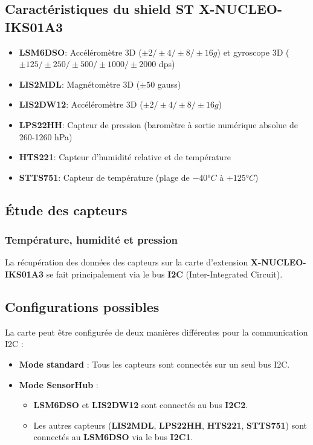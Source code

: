 \documentclass[12pt]{article}
\begin{document}
\subsection{Caractéristiques du shield ST X-NUCLEO-IKS01A3}
\begin{itemize}
    \item \textbf{LSM6DSO}: Accéléromètre 3D ($\pm2/\pm4/\pm8/\pm16g$) et gyroscope 3D ($\pm125/\pm250/\pm500/\pm1000/\pm2000$ dps)
    \item \textbf{LIS2MDL}: Magnétomètre 3D ($\pm50$ gauss)
    \item \textbf{LIS2DW12}: Accéléromètre 3D ($\pm2/\pm4/\pm8/\pm16g$)
    \item \textbf{LPS22HH}: Capteur de pression (baromètre à sortie numérique absolue de 260-1260 hPa)
    \item \textbf{HTS221}: Capteur d'humidité relative et de température
    \item \textbf{STTS751}: Capteur de température (plage de $-40°C$ à $+125°C$)
\end{itemize}

\subsection{Étude des capteurs}
\subsubsection{Température, humidité et pression}
La récupération des données des capteurs sur la carte d'extension \textbf{X-NUCLEO-IKS01A3} se fait principalement via le bus \textbf{I2C} (Inter-Integrated Circuit).

\subsection*{Configurations possibles}

La carte peut être configurée de deux manières différentes pour la communication I2C :
\begin{itemize}
    \item \textbf{Mode standard} : Tous les capteurs sont connectés sur un seul bus I2C.
    \item \textbf{Mode SensorHub} :
    \begin{itemize}
        \item \textbf{LSM6DSO} et \textbf{LIS2DW12} sont connectés au bus \textbf{I2C2}.
        \item Les autres capteurs (\textbf{LIS2MDL}, \textbf{LPS22HH}, \textbf{HTS221}, \textbf{STTS751}) sont connectés au \textbf{LSM6DSO} via le bus \textbf{I2C1}.
    \end{itemize}
\end{itemize}
\end{document}
